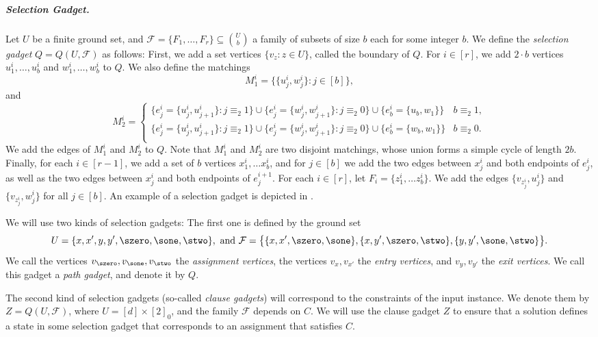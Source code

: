 \documentclass[a4paper,UKenglish,cleveref, autoref, thm-restate]{lipics-v2021}
\begin{document}
\subparagraph*{Selection Gadget.} Let $U$ be a finite ground set, and $\mathcal{F} = \{F_1, \dots, F_r\}\subseteq \binom{U}{b}$ a family of subsets of size $b$ each for some integer $b$. We define the \emph{selection gadget} $Q = Q(U, \mathcal{F})$ as follows: First, we add a set vertices $\{v_z \colon z \in U\}$, called the boundary of $Q$. For $i\in[r]$, we add $2 \cdot b$ vertices $u^i_1,\dots, u^i_b$ and $w^i_1, \dots, w^i_b$ to $Q$. 
We also define the matchings
\[
    M^i_1 = \big\{\{u^i_j, w^i_j\} \colon j\in[b]\big\},
\]
and 
\begin{equation*}
    M^i_2 = 
    \begin{cases}
        \big\{e^i_j = \{u^i_j, u^{i}_{j+1}\}\colon j \equiv_2 1\big\} \cup \big\{e^i_j = \{w^i_j, w^{i}_{j+1}\}\colon j \equiv_2 0\big\} \cup \{e^i_b = \{u_b,w_1\}\} & b\equiv_2 1,\\
        \big\{e^i_j = \{u^i_j, u^{i}_{j+1}\}\colon j \equiv_2 1\big\} \cup \big\{e^i_j = \{w^i_j, w^{i}_{j+1}\}\colon j \equiv_2 0\big\} \cup \{e^i_b = \{w_b, w_1\}\} & b\equiv_2 0.\\
    \end{cases}
\end{equation*}
We add the edges of $M^i_1$ and $M^i_2$ to $Q$. Note that $M^i_1$ and $M^i_2$ are two disjoint matchings, whose union forms a simple cycle of length $2b$. Finally, for each $i\in[r-1]$, we add a set of $b$ vertices $x^i_1, \dots x^i_b$, and for $j\in[b]$ we add the two edges between $x^i_j$ and both endpoints of $e^i_j$, as well as the two edges between $x^i_j$ and both endpoints of $e^{i+1}_j$. For each $i\in[r]$, let $F_i = \{z^i_1, \dots z^i_b\}$. We add the edges $\{v_{z^i_j}, u^i_j\}$ and $\{v_{z^i_j}, w^i_j\}$ for all $j\in[b]$. An example of a selection gadget is depicted in .


\medskip

We will use two kinds of selection gadgets: The first one is defined by the ground set
\[U = \{x, x', y, y', \szero, \sone, \stwo\}, \text{ and }
\mathcal{F}=\big\{\{x,x',\szero, \sone\},\{x,y',\szero, \stwo\},\{y,y',\sone, \stwo\}\big\}.\]
 We call the vertices $v_{\szero}, v_{\sone}, v_{\stwo}$ the \emph{assignment vertices}, the vertices $v_x, v_{x'}$ the \emph{entry vertices}, and $v_y, v_{y'}$ the \emph{exit vertices}. We call this gadget a \emph{path gadget}, and denote it by $Q$. 
 
 The second kind of selection gadgets (so-called \emph{clause gadgets}) will correspond to the constraints of the input instance. We denote them by $Z = Q(U, \mathcal{F})$, where $U = [d] \times [2]_0$, and the family $\mathcal{F}$ depends on $C$. We will use the clause gadget $Z$ to ensure that a solution defines a state in some selection gadget that corresponds to an assignment that satisfies $C$.
 
\end{document}
